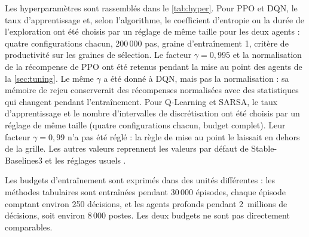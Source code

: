 \documentclass[11pt,a4paper]{article}
\newif\ifrevmarks
\newcommand{\revtag}[1]{\ifrevmarks\textsuperscript{\textcolor{red!70!black}{\scriptsize[#1]}}\fi}
\newenvironment{revbloc}[1]{\par\ifrevmarks\color{revcolor}\noindent\revtag{#1}\ \fi}{\par}
\begin{document}
\begin{revbloc}{M12, v3}
Les hyperparamètres sont rassemblés dans le \cref{tab:hyper}. Pour PPO et DQN, le taux d'apprentissage et, selon l'algorithme, le coefficient d'entropie ou la durée de l'exploration ont été choisis par un réglage de même taille pour les deux agents : quatre configurations chacun, 200\,000 pas, graine d'entraînement 1, critère de productivité sur les graines de sélection. Le facteur $\gamma = 0{,}995$ et la normalisation de la récompense de PPO ont été retenus pendant la mise au point des agents de la \cref{sec:tuning}. Le même $\gamma$ a été donné à DQN, mais pas la normalisation : sa mémoire de rejeu conserverait des récompenses normalisées avec des statistiques qui changent pendant l'entraînement. Pour Q-Learning et SARSA, le taux d'apprentissage et le nombre d'intervalles de discrétisation ont été choisis par un réglage de même taille (quatre configurations chacun, budget complet). Leur facteur $\gamma = 0{,}99$ n'a pas été réglé : la règle de mise au point le laissait en dehors de la grille. Les autres valeurs reprennent les valeurs par défaut de Stable-Baselines3 et les réglages usuels \cite{JohnSchulman2017, Mnih2015}.

Les budgets d'entraînement sont exprimés dans des unités différentes : les méthodes tabulaires sont entraînées pendant 30\,000 épisodes, chaque épisode comptant environ 250 décisions, et les agents profonds pendant 2~millions de décisions, soit environ 8\,000 postes. Les deux budgets ne sont pas directement comparables.
\end{revbloc}
\end{document}

